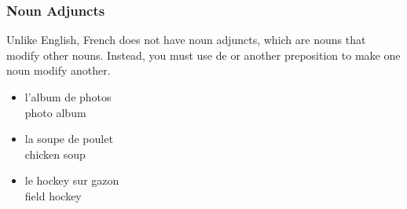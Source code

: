 \subsubsection{Noun Adjuncts}

Unlike English, French does not have noun adjuncts, which are nouns that modify other nouns. Instead, you must use de or another preposition to make one noun modify another.

\begin{itemize}
  \item  l'album de photos \\ photo album
  \item  la soupe de poulet \\ chicken soup 
  \item  le hockey sur gazon \\ field hockey
\end{itemize}

